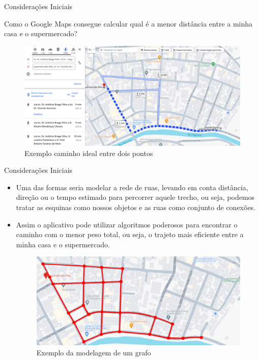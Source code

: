 \documentclass{if-beamer}
\begin{document}
\begin{frame}{Considerações Iniciais}

\justifying
Como o Google Maps consegue calcular qual é a menor distância entre a minha casa e o supermercado?

\begin{figure}
\includegraphics[scale=0.3]{Figuras/exemplos-grafo/a.png} 
\caption{Exemplo caminho ideal entre dois pontos}
\end{figure} 
\end{frame}

\begin{frame}{Considerações Iniciais}
\begin{itemize}
\justifying
\item Uma das formas seria modelar a rede de ruas, levando em conta distância, direção ou o tempo estimado para percorrer aquele trecho, ou seja, podemos tratar as esquinas como nossos objetos e as ruas como conjunto de conexões.
\item Assim o aplicativo pode utilizar algoritmos poderosos para encontrar o caminho com o menor peso total, ou seja, o trajeto mais eficiente entre a minha casa e o supermercado.
\begin{figure}
\includegraphics[scale=0.33]{Figuras/exemplos-grafo/b.png} 
\caption{Exemplo da modelagem de um grafo}
\end{figure}
\end{itemize} 
\end{frame}
\end{document}
